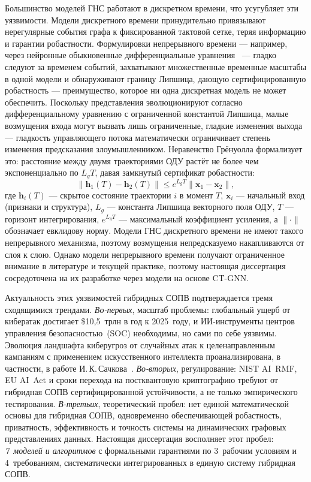 Большинство моделей ГНС работают в дискретном времени, что усугубляет эти уязвимости. Модели дискретного времени принудительно привязывают нерегулярные события графа к фиксированной тактовой сетке, теряя информацию и гарантии робастности. Формулировки непрерывного времени --- например, через нейронные обыкновенные дифференциальные уравнения~\cite{Chen2018,Chamberlain2021,Rusch2022} --- гладко следуют за временем событий, захватывают множественные временные масштабы в одной модели и обнаруживают границу Липшица, дающую сертифицированную робастность --- преимущество, которое ни одна дискретная модель не может обеспечить. Поскольку представления эволюционируют согласно дифференциальному уравнению с ограниченной константой Липшица, малые возмущения входа могут вызвать лишь ограниченные, гладкие изменения выхода --- гладкость управляющего потока математически ограничивает степень изменения предсказания злоумышленником. Неравенство Грёнуолла формализует это: расстояние между двумя траекториями ОДУ растёт не более чем экспоненциально по $L_g T$, давая замкнутый сертификат робастности:
\begin{equation}
\|\mathbf{h}_1(T)-\mathbf{h}_2(T)\|\le e^{L_g T}\|\mathbf{x}_1-\mathbf{x}_2\|,
\label{eq:gronwall}
\end{equation}
где $\mathbf{h}_i(T)$ --- скрытое состояние траектории $i$ в момент $T$, $\mathbf{x}_i$ --- начальный вход (признаки и структура), $L_g$ --- константа Липшица векторного поля ОДУ, $T$ --- горизонт интегрирования, $e^{L_gT}$ --- максимальный коэффициент усиления, а $\|\cdot\|$ обозначает евклидову норму. Модели ГНС дискретного времени не имеют такого непрерывного механизма, поэтому возмущения непредсказуемо накапливаются от слоя к слою. Однако модели непрерывного времени получают ограниченное внимание в литературе и текущей практике, поэтому настоящая диссертация сосредоточена на их разработке через модели на основе CT-GNN.

Актуальность этих уязвимостей гибридных СОПВ подтверждается
тремя сходящимися трендами. \emph{Во-первых}, масштаб проблемы:
глобальный ущерб от кибератак достигает \$10{,}5~трлн в год к
2025~году, и ИИ-инструменты центров управления безопасностью~(SOC)
необходимы, но сами по себе уязвимы. Эволюция ландшафта киберугроз
от случайных атак к целенаправленным кампаниям с применением
искусственного интеллекта проанализирована, в частности, в работе
И.\,К.\,Сачкова~\cite{Sachkov2022threat}. \emph{Во-вторых},
регулирование: NIST AI~RMF, EU AI~Act и сроки перехода на
постквантовую криптографию требуют от гибридная СОПВ сертифицированной
устойчивости, а не только эмпирического тестирования.
\emph{В-третьих}, теоретический пробел: нет единой математической
основы для гибридная СОПВ, одновременно обеспечивающей робастность,
приватность, эффективность и точность системы на динамических
графовых представлениях данных. Настоящая диссертация восполняет
этот пробел: \emph{7~моделей и алгоритмов} с формальными гарантиями
по 3~рабочим условиям и 4~требованиям, систематически интегрированных
в единую систему гибридная СОПВ.

